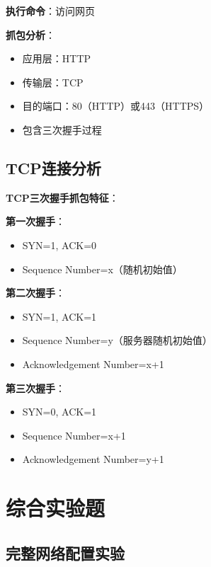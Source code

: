 \documentclass[12pt,a4paper]{ctexart}
\begin{document}
\begin{exambox}[HTTP访问抓包]
\textbf{执行命令}：访问网页

\textbf{抓包分析}：
\begin{itemize}[itemsep=0pt]
    \item 应用层：HTTP
    \item 传输层：TCP
    \item 目的端口：80（HTTP）或443（HTTPS）
    \item 包含三次握手过程
\end{itemize}
\end{exambox}

\subsection{TCP连接分析}

\begin{keybox}
\textbf{TCP三次握手抓包特征}：

\textbf{第一次握手}：
\begin{itemize}[itemsep=0pt]
    \item SYN=1, ACK=0
    \item Sequence Number=x（随机初始值）
\end{itemize}

\textbf{第二次握手}：
\begin{itemize}[itemsep=0pt]
    \item SYN=1, ACK=1
    \item Sequence Number=y（服务器随机初始值）
    \item Acknowledgement Number=x+1
\end{itemize}

\textbf{第三次握手}：
\begin{itemize}[itemsep=0pt]
    \item SYN=0, ACK=1
    \item Sequence Number=x+1
    \item Acknowledgement Number=y+1
\end{itemize}
\end{keybox}

\section{综合实验题}

\subsection{完整网络配置实验}
\end{document}
